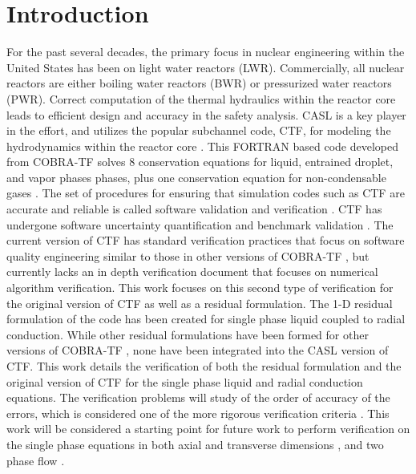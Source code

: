 \vspace*{-80mm}
\chapter{Introduction} \label{chapter1:introduction}

For the past several decades, the primary focus in nuclear engineering within
the United States has been on light water reactors (LWR). Commercially,
all nuclear reactors are either boiling water reactors (BWR) or pressurized
water reactors (PWR). Correct computation of the thermal hydraulics within the
reactor core leads to efficient design and accuracy in the safety analysis. 
CASL is a key player in the effort, and utilizes the popular subchannel code,
CTF, for modeling the hydrodynamics within the reactor core \cite{Schmidt2014}.
This FORTRAN based code developed from COBRA-TF solves 8 conservation equations
for liquid, entrained droplet, and vapor phases phases, plus one conservation
equation for non-condensable gases \cite{CTF_theory}. The set of procedures
for ensuring that simulation codes such as CTF are accurate and reliable is
called software validation and verification \cite{Oberkampf2008}. CTF has
undergone software uncertainty quantification and benchmark
validation \cite{Avramova2015}. The current version of CTF has standard verification
practices that focus on software quality engineering similar to those in other
versions of COBRA-TF \cite{Aumiller2013}, but currently lacks an in depth
verification document that focuses on numerical algorithm verification.
This work focuses on this second type of verification for the original version
of CTF as well as a residual formulation. The 1-D residual formulation of the
code has been created for single phase liquid coupled to radial conduction.
While other residual formulations have been formed for other versions of
COBRA-TF \cite{Lloyd2014}, none have been integrated into the CASL version of
CTF. This work details the verification of both the residual formulation and the
original version of CTF for the single phase liquid and radial conduction
equations. The verification problems will study of the order of accuracy of the
errors, which is considered one of the more rigorous verification criteria
\cite{Roy2005}. This work will be considered a starting point for future work to
perform verification on the single phase equations in both axial and transverse
dimensions \cite{Merroun2009}, and two phase flow \cite{Mahadevan2009}.

